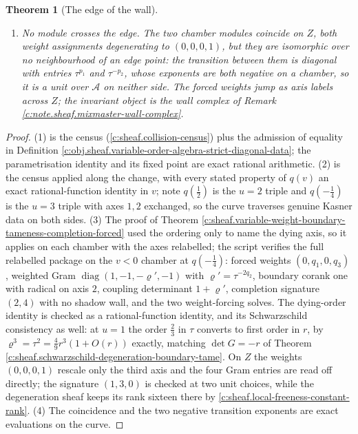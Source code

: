 \documentclass[11pt]{article}
\newtheorem{theorem}{Theorem}[section]
\theoremstyle{definition}
\theoremstyle{plain}
\begin{document}
\begin{theorem}[The edge of the wall]
\begin{enumerate}
\item \emph{No module crosses the edge.} The two chamber modules coincide on $Z$, both weight assignments degenerating to $(0,0,0,1)$, but they are isomorphic over no neighbourhood of an edge point: the transition between them is diagonal with entries $\tau^{p_1}$ and $\tau^{-p_2}$, whose exponents are both negative on a chamber, so it is a unit over $\mathcal{A}$ on neither side. The forced weights jump as axis labels across $Z$; the invariant object is the wall complex of Remark \ref{c:note.sheaf.mixmaster-wall-complex}.
\end{enumerate}
\end{theorem}
\begin{proof}
(1) is the census (\ref{c:sheaf.collision-census}) plus the admission of equality in Definition \ref{c:obj.sheaf.variable-order-algebra-strict-diagonal-data}; the parametrisation identity and its fixed point are exact rational arithmetic. (2) is the census applied along the change, with every stated property of $q(v)$ an exact rational-function identity in $v$; note $q(\tfrac12)$ is the $u=2$ triple and $q(-\tfrac14)$ is the $u=3$ triple with axes $1,2$ exchanged, so the curve traverses genuine Kasner data on both sides. (3) The proof of Theorem \ref{c:sheaf.variable-weight-boundary-tameness-completion-forced} used the ordering only to name the dying axis, so it applies on each chamber with the axes relabelled; the script verifies the full relabelled package on the $v<0$ chamber at $q(-\tfrac14)$: forced weights $(0,q_1,0,q_3)$, weighted Gram $\operatorname{diag}(1,-1,-\varrho',-1)$ with $\varrho' = \tau^{-2q_2}$, boundary corank one with radical on axis $2$, coupling determinant $1+\varrho'$, completion signature $(2,4)$ with no shadow wall, and the two weight-forcing solves. The dying-order identity is checked as a rational-function identity, and its Schwarzschild consistency as well: at $u=1$ the order $\tfrac23$ in $\tau$ converts to first order in $r$, by $\varrho^3 = \tau^2 = \tfrac49 r^3(1 + O(r))$ exactly, matching $\det G = -r$ of Theorem \ref{c:sheaf.schwarzschild-degeneration-boundary-tame}. On $Z$ the weights $(0,0,0,1)$ rescale only the third axis and the four Gram entries are read off directly; the signature $(1,3,0)$ is checked at two unit choices, while the degeneration sheaf keeps its rank sixteen there by \ref{c:sheaf.local-freeness-constant-rank}. (4) The coincidence and the two negative transition exponents are exact evaluations on the curve.

\end{proof}
\end{document}
